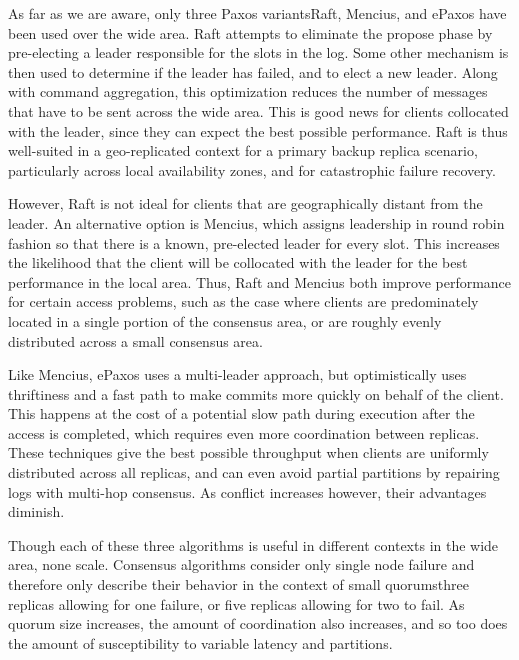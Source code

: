 \documentclass[sigplan,screen,review,anonymous,nonacm]{acmart}
\begin{document}
As far as we are aware, only three Paxos variants\textemdash Raft, Mencius, and ePaxos
\textemdash have been used over the wide area. 
Raft attempts to eliminate the propose phase by pre-electing a leader responsible for the 
slots in the log.
Some other mechanism is then used to determine if the leader has failed, and to elect 
a new leader. 
Along with command aggregation, this optimization reduces the number of messages that 
have to be sent across the wide area.
This is good news for clients collocated with the leader, since they can expect the best
possible performance.
Raft is thus well-suited in a geo-replicated context for a primary backup replica 
scenario, particularly across local availability zones, and for catastrophic failure 
recovery.

However, Raft is not ideal for clients that are geographically distant from the leader.
An alternative option is Mencius, which assigns leadership in round robin fashion so that
there is a known, pre-elected leader for every slot.
This increases the likelihood that the client will be collocated with the leader for the 
best performance in the local area.
Thus, Raft and Mencius both improve performance for certain access problems, such as the 
case where clients are predominately located in a single portion of the consensus area, 
or are roughly evenly distributed across a small consensus area.

Like Mencius, ePaxos uses a multi-leader approach, but optimistically uses thriftiness 
and a fast path to make commits more quickly on behalf of the client.
This happens at the cost of a potential slow path during execution after the access is
completed, which requires even more coordination between replicas. 
These techniques give the best possible throughput when clients are uniformly 
distributed across all replicas, and can even avoid partial partitions by repairing 
logs with multi-hop consensus.
As conflict increases however, their advantages diminish. 

Though each of these three algorithms is useful in different contexts in the wide area, 
none scale. 
Consensus algorithms consider only single node failure and therefore only describe 
their behavior in the context of small quorums\textemdash three replicas allowing for 
one failure, or five replicas allowing for two to fail. 
As quorum size increases, the amount of coordination also increases, and so too does 
the amount of susceptibility to variable latency and partitions. 
\end{document}
